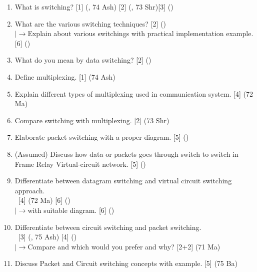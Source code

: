 \documentclass[12pt]{article}
\newcommand{\lb}{\\$\left|\rightarrow\right.$}
\newcommand{\enter}{\\\textcolor{white}{1}}
\begin{document}
\begin{enumerate}[noitemsep, topsep=0pt]
	\item What is switching? \hfill [1] (, 74 Ash) [2] (, 73 Shr)[3] ()
	
	\item What are the various switching techniques? \hfill [2] ()
	\lb Explain about various switchings with practical implementation example. \hfill [6] ()
	
	\item What do you mean by data switching? \hfill [2] ()
	
	\item Define multiplexing. \hfill [1] (74 Ash)
	
	\item Explain different types of multiplexing used in communication system. \hfill [4] (72 Ma)
	
	\item Compare switching with multiplexing. \hfill [2] (73 Shr)

	\item Elaborate packet switching with a proper diagram. \hfill [5] ()	
	
	\item (Assumed) Discuss how data or packets goes through switch to switch in Frame Relay Virtual-circuit network. \hspace{12.6cm} [5] ()
	
	\item Differentiate between datagram switching and virtual circuit switching approach. 
	\enter \hfill [4] (72 Ma) [6] ()
	\lb with suitable diagram. \hfill [6] ()
	
	\item Differentiate between circuit switching and packet switching. 
	\enter\hfill [3] (, 75 Ash) [4] ()
	\lb Compare and which would you prefer and why? \hfill [2+2] (71 Ma)
	
	\item Discuss Packet and Circuit switching concepts with example. \hfill [5] (75 Ba)
\end{enumerate}
\end{document}
